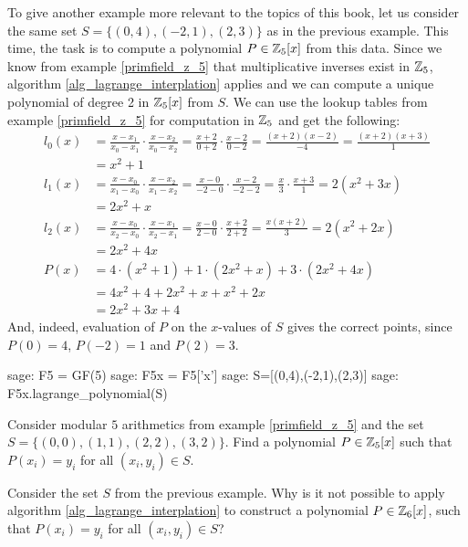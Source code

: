 \begin{example} To give another example more relevant to the topics of this book, let us consider the same set $S=\{(0,4),(-2,1),(2,3)\}$ as in the previous example. This time, the task is to compute a polynomial $P\in\mathbb{Z}_5[x]$ from this data. Since we know
from example \ref{primfield_z_5} that multiplicative inverses exist in $\mathbb{Z}_5$, algorithm \ref{alg_lagrange_interplation} applies and we can compute a unique polynomial of degree 2 in $\mathbb{Z}_5[x]$ from $S$. We can use the lookup tables from example \ref{primfield_z_5} for computation in $\mathbb{Z}_5$ and get the following:
\begin{align*}
l_0(x) & = \frac{x-x_1}{x_0-x_1}\cdot\frac{x-x_2}{x_0-x_2}
         = \frac{x+2}{0+2}\cdot\frac{x-2}{0-2}
         =  \frac{(x+2)(x-2)}{-4}
         =  \frac{(x+2)(x+3)}{1}\\
       & =  x^2+1\\
l_1(x) & =  \frac{x-x_0}{x_1-x_0}\cdot\frac{x-x_2}{x_1-x_2}
         = \frac{x-0}{-2-0}\cdot \frac{x-2}{-2-2}
         = \frac{x}{3}\cdot \frac{x+3}{1}
         = 2(x^2+3x)\\
       & =  2x^2+x\\
l_2(x) & = \frac{x-x_0}{x_2-x_0}\cdot\frac{x-x_1}{x_2-x_1}
         = \frac{x-0}{2-0}\cdot\frac{x+2}{2+2}
         = \frac{x(x+2)}{3}
         = 2(x^2+2x)\\
       & = 2x^2+4x\\
P(x)   & = 4\cdot (x^2+1) + 1\cdot (2x^2+x) + 3\cdot (2x^2+4x) \\
       & = 4x^2+4 + 2x^2 +x + x^2+2x\\
       & = 2x^2 +3x +4       
\end{align*}
And, indeed, evaluation of $P$ on the $x$-values of $S$ gives the correct points, since $P(0)=4$, $P(-2)=1$ and $P(2)=3$.
\begin{sagecommandline}sage: F5 = GF(5)
sage: F5x = F5['x']
sage: S=[(0,4),(-2,1),(2,3)]
sage: F5x.lagrange_polynomial(S)
\end{sagecommandline}
\end{example}
\begin{exercise}
Consider modular $5$ arithmetics from example \ref{primfield_z_5} and the set 
$S=\{(0,0),(1,1),(2,2),(3,2)\}$. Find a polynomial $P\in\mathbb{Z}_5[x]$ such that $P(x_i)=y_i$ for all $(x_i,y_i)\in S$.
\end{exercise}
\begin{exercise}
Consider the set $S$ from the previous example. Why is it not possible to apply algorithm \ref{alg_lagrange_interplation} to construct a polynomial $P\in \mathbb{Z}_6[x]$,  such that $P(x_i)=y_i$ for all $(x_i,y_i)\in S$?
\end{exercise}



